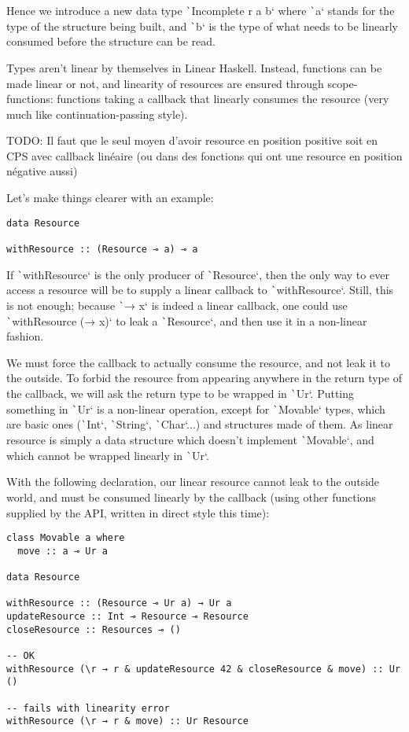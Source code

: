 \documentclass[english]{jflart}
\begin{document}
Hence we introduce a new data type \texttt`Incomplete r a b` where \texttt`a` stands for the type of the structure being built, and \texttt`b` is the type of what needs to be linearly consumed before the structure can be read.

Types aren't linear by themselves in Linear Haskell. Instead, functions can be made linear or not, and linearity of resources are ensured through scope-functions: functions taking a callback that linearly consumes the resource (very much like continuation-passing style).

TODO: Il faut que le seul moyen d'avoir resource en position positive soit en CPS avec callback linéaire (ou dans des fonctions qui ont une resource en position négative aussi)

Let's make things clearer with an example:
\begin{verbatim}
data Resource

withResource :: (Resource ⊸ a) ⊸ a
\end{verbatim}

If \texttt`withResource` is the only producer of \texttt`Resource`, then the only way to ever access a resource will be to supply a linear callback to \texttt`withResource`. Still, this is not enough; because \texttt`\x → x` is indeed a linear callback, one could use \texttt`withResource (\x → x)` to leak a \texttt`Resource`, and then use it in a non-linear fashion.

We must force the callback to actually consume the resource, and not leak it to the outside. To forbid the resource from appearing anywhere in the return type of the callback, we will ask the return type to be wrapped in \texttt`Ur`. Putting something in \texttt`Ur` is a non-linear operation, except for \texttt`Movable` types, which are basic ones (\texttt`Int`, \texttt`String`, \texttt`Char`...) and structures made of them. As linear resource is simply a data structure which doesn't implement \texttt`Movable`, and which cannot be wrapped linearly in \texttt`Ur`.

With the following declaration, our linear resource cannot leak to the outside world, and must be consumed linearly by the callback (using other functions supplied by the API, written in direct style this time):

\begin{verbatim}
class Movable a where
  move :: a ⊸ Ur a

data Resource

withResource :: (Resource ⊸ Ur a) → Ur a
updateResource :: Int ⊸ Resource ⊸ Resource
closeResource :: Resources ⊸ ()

-- OK
withResource (\r → r & updateResource 42 & closeResource & move) :: Ur ()

-- fails with linearity error
withResource (\r → r & move) :: Ur Resource
\end{verbatim}
\end{document}
